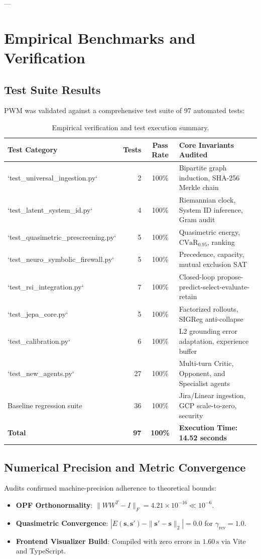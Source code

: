 \documentclass[11pt,a4paper]{article}
\begin{document}
---

\section{Empirical Benchmarks and Verification}

\subsection{Test Suite Results}
PWM was validated against a comprehensive test suite of 97 automated tests:
\begin{table}[h]
\centering
\small
\begin{tabularx}{\textwidth}{lrcX}
\toprule
\textbf{Test Category} & \textbf{Tests} & \textbf{Pass Rate} & \textbf{Core Invariants Audited} \\
\midrule
`test_universal_ingestion.py` & 2 & 100\% & Bipartite graph induction, SHA-256 Merkle chain \\
`test_latent_system_id.py` & 4 & 100\% & Riemannian clock, System ID inference, Gram audit \\
`test_quasimetric_prescreening.py` & 5 & 100\% & Quasimetric energy, $\text{CVaR}_{0.95}$, ranking \\
`test_neuro_symbolic_firewall.py` & 5 & 100\% & Precedence, capacity, mutual exclusion SAT \\
`test_rsi_integration.py` & 7 & 100\% & Closed-loop propose-predict-select-evaluate-retain \\
`test_jepa_core.py` & 5 & 100\% & Factorized rollouts, SIGReg anti-collapse \\
`test_calibration.py` & 6 & 100\% & L2 grounding error adaptation, experience buffer \\
`test_new_agents.py` & 27 & 100\% & Multi-turn Critic, Opponent, and Specialist agents \\
Baseline regression suite & 36 & 100\% & Jira/Linear ingestion, GCP scale-to-zero, security \\
\midrule
\textbf{Total} & \textbf{97} & \textbf{100\%} & \textbf{Execution Time: 14.52 seconds} \\
\bottomrule
\end{tabularx}
\caption{Empirical verification and test execution summary.}
\end{table}

\subsection{Numerical Precision and Metric Convergence}
Audits confirmed machine-precision adherence to theoretical bounds:
\begin{itemize}
    \item \textbf{OPF Orthonormality}: $\|W W^T - I\|_F = 4.21 \times 10^{-16} \ll 10^{-6}$.
    \item \textbf{Quasimetric Convergence}: $|E(\mathbf{s}, \mathbf{s}') - \|\mathbf{s}' - \mathbf{s}\|_2| = 0.0$ for $\gamma_{\text{rev}} = 1.0$.
    \item \textbf{Frontend Visualizer Build}: Compiled with zero errors in $1.60\,\text{s}$ via Vite and TypeScript.
\end{itemize}
\end{document}
